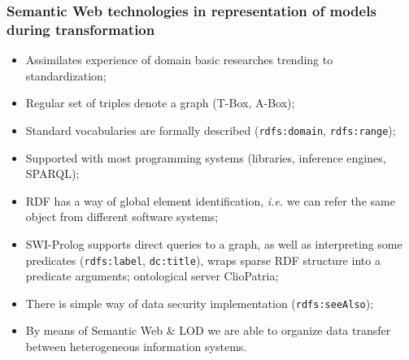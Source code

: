\documentclass[10pt]{beamer}
\begin{document}
\begin{frame}[fragile]
  \frametitle{Semantic Web technologies in representation of models
    during transformation}
  \begin{itemize}
  \item Assimilates experience of domain basic researches trending to standardization;
  \item Regular set of triples denote a graph (T-Box, A-Box);
  \item Standard vocabularies are formally described (\verb|rdfs:domain|, \verb|rdfs:range|);
  \item Supported with most programming systems (libraries, inference engines, SPARQL);
  \item RDF has a way of global element identification, \emph{i.e.} we can refer the same object from different software systems;
  \item SWI-Prolog supports direct queries to a graph, as well as interpreting some predicates (\verb|rdfs:label|, \verb|dc:title|), wraps sparse RDF structure into a predicate arguments; ontological server ClioPatria;
  \item There is simple way of data security implementation (\verb|rdfs:seeAlso|);
  \item By means of Semantic Web \& LOD we are able to organize data transfer between heterogeneous information systems.
  \end{itemize}
\end{frame}
\end{document}
